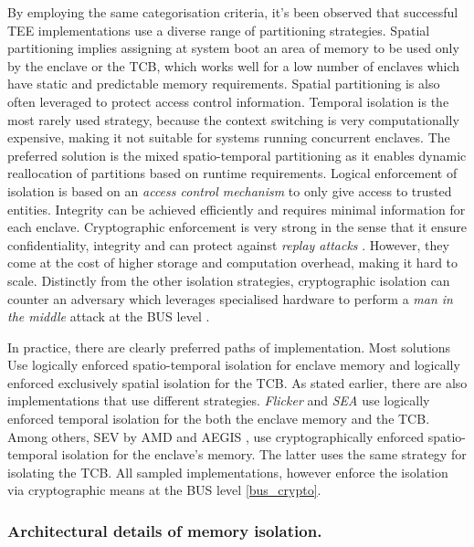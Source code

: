 \documentclass[runningheads,a4paper]{uwsese}
\begin{document}
By employing the same categorisation criteria, it's been observed that
successful TEE implementations use a diverse range of partitioning strategies.
Spatial partitioning implies assigning at system boot an area of memory to be
used only by the enclave or the TCB, which works well for a low number of
enclaves which have static and predictable memory requirements. Spatial
partitioning is also often leveraged to protect access control information.
Temporal isolation is the most rarely used strategy, because the context
switching is very computationally expensive, making it not suitable for systems
running concurrent enclaves. The preferred solution is the mixed
spatio-temporal partitioning as it enables dynamic reallocation of partitions
based on runtime requirements. Logical enforcement of isolation is based on an
\emph{access control mechanism} \label{acc_control} to only give access to
trusted entities. Integrity can be achieved efficiently and requires minimal
information for each enclave. Cryptographic enforcement is very strong in the
sense that it ensure confidentiality, integrity and can protect against
\emph{replay attacks} \cite{tee_replay_attacks}. However, they come at the cost
of higher storage and computation overhead, making it hard to scale. Distinctly
from the other isolation strategies, cryptographic isolation can counter an
adversary which leverages specialised hardware to perform a \emph{man in the
middle} attack at the BUS level \cite{tee_hw_sup} \label{bus_crypto}.

In practice, there are clearly preferred paths of implementation. Most
solutions Use logically enforced spatio-temporal isolation for enclave memory
and logically enforced exclusively spatial isolation for the TCB. As stated
earlier, there are also implementations that use different strategies.
\emph{Flicker} \cite{flicker} and \emph{SEA} \cite{sea_minimal_tcb} use
logically enforced temporal isolation for the both the enclave memory and the
TCB. Among others, SEV \cite{amd_sev} by AMD and AEGIS \cite{aegis}, use
cryptographically enforced spatio-temporal isolation for the enclave's memory.
The latter uses the same strategy for isolating the TCB. All sampled
implementations, however enforce the isolation via cryptographic means at the
BUS level \ref{bus_crypto}.

\subsubsection{Architectural details of memory isolation.}
\end{document}
